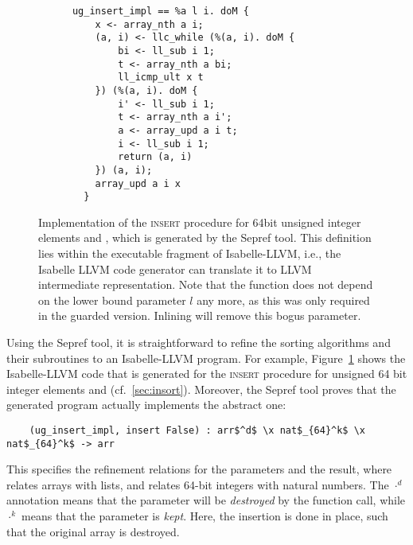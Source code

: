 \documentclass[runningheads]{llncs}
\begin{document}
  \begin{figure}
    \begin{minipage}{.5\textwidth}
    \begin{lstlisting}
      ug_insert_impl == %a l i. doM {
          x <- array_nth a i;
          (a, i) <- llc_while (%(a, i). doM {
              bi <- ll_sub i 1;
              t <- array_nth a bi;
              ll_icmp_ult x t
          }) (%(a, i). doM {
              i' <- ll_sub i 1;
              t <- array_nth a i';
              a <- array_upd a i t;
              i <- ll_sub i 1;
              return (a, i)
          }) (a, i);
          array_upd a i x
        }
    \end{lstlisting}
    \end{minipage}
    \begin{minipage}{.49\textwidth}
    \caption{Implementation of the \textsc{insert} procedure for 64bit unsigned integer elements and , which
      is generated by the Sepref tool.
      This definition lies within the executable fragment of Isabelle-LLVM, i.e.,
      the Isabelle LLVM code generator can translate it to LLVM intermediate representation.
      Note that the function does not
      depend on the lower bound parameter \is$l$ any more, as this was only required in the guarded version.
      Inlining will remove this bogus parameter.
    }\label{fig:ug_insort_isa_llvm}
    \end{minipage}
  \end{figure}
  Using the Sepref tool, it is straightforward to refine the sorting algorithms and their subroutines to an Isabelle-LLVM program.
  For example, Figure~\ref{fig:ug_insort_isa_llvm} shows the Isabelle-LLVM code that is generated for the \textsc{insert} procedure
  for unsigned 64 bit integer elements and  (cf.~\ref{sec:insort}).
  Moreover, the Sepref tool proves that the generated program actually implements the abstract one:
  \begin{lstlisting}
    (ug_insert_impl, insert False) : arr$^d$ \x nat$_{64}^k$ \x nat$_{64}^k$ -> arr
  \end{lstlisting}
  This specifies the refinement relations for the parameters and the result, where  relates arrays with lists,
  and  relates 64-bit integers with natural numbers.
  The $\cdot^d$ annotation means that the parameter will be \emph{destroyed} by the function call,
  while $\cdot^k$ means that the parameter is \emph{kept}.
  Here, the insertion is done in place, such that the original array is destroyed.
\end{document}
